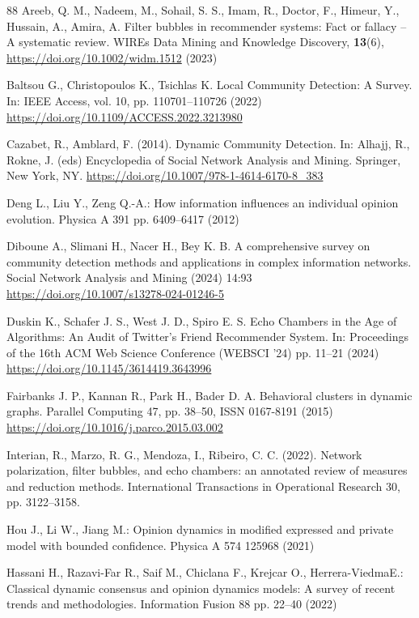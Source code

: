 \begin{thebibliography}{88}
Areeb, Q. M., Nadeem, M., Sohail, S. S., Imam, R., Doctor, F., Himeur, Y., Hussain, A., Amira, A. Filter bubbles in recommender systems: Fact or fallacy -- A systematic review. WIREs Data Mining and Knowledge Discovery, \textbf{13}(6), \url{https://doi.org/10.1002/widm.1512} (2023)

Baltsou G., Christopoulos K., Tsichlas K. Local Community Detection: A Survey. In: IEEE Access, vol. 10, pp. 110701--110726 (2022) \url{https://doi.org/10.1109/ACCESS.2022.3213980}

Cazabet, R., Amblard, F. (2014). Dynamic Community Detection. In: Alhajj, R., Rokne, J. (eds) Encyclopedia of Social Network Analysis and Mining. Springer, New York, NY. \url{https://doi.org/10.1007/978-1-4614-6170-8_383}

 Deng L., Liu Y., Zeng Q.-A.: How information influences an individual opinion evolution. Physica A 391 pp. 6409--6417 (2012)

Diboune A., Slimani H., Nacer H., Bey K. B. A comprehensive survey on community detection methods and applications in complex information networks. Social Network Analysis and Mining (2024) 14:93 \url{https://doi.org/10.1007/s13278-024-01246-5}

Duskin K., Schafer J. S., West J. D., Spiro E. S. Echo Chambers in the Age of Algorithms: An Audit of Twitter’s Friend Recommender System. In: Proceedings of the 16th ACM Web Science Conference (WEBSCI '24) pp. 11--21 (2024) \url{https://doi.org/10.1145/3614419.3643996}

Fairbanks J. P., Kannan R., Park H., Bader D. A. Behavioral clusters in dynamic graphs. Parallel Computing 47, pp. 38--50, ISSN 0167-8191 (2015) \url{https://doi.org/10.1016/j.parco.2015.03.002}

Interian, R., Marzo, R. G., Mendoza, I.,  Ribeiro, C. C. (2022). Network polarization, filter bubbles, and echo chambers: an annotated review of measures and reduction methods. International Transactions in Operational Research 30, pp. 3122--3158.

 Hou J., Li W., Jiang M.: Opinion dynamics in modified expressed and private model with bounded confidence. Physica A 574 125968 (2021)

 Hassani H., Razavi-Far R., Saif M., Chiclana F., Krejcar O., Herrera-ViedmaE.: Classical dynamic consensus and opinion dynamics models: A survey of recent trends and methodologies. Information Fusion 88 pp. 22--40 (2022)


\end{thebibliography}
